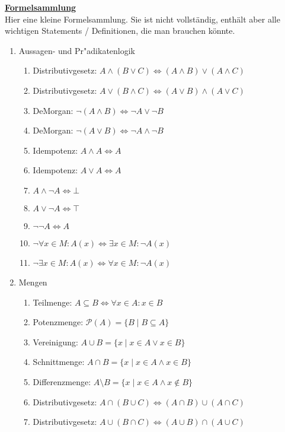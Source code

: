 \hspace{5cm}
\newpage
\underline{\textbf{Formelsammlung}}\\
Hier eine kleine Formelsammlung. Sie ist nicht vollständig, enthält aber alle wichtigen Statements / Definitionen, die man brauchen könnte.
\begin{enumerate}
\item Aussagen- und Pr"adikatenlogik
\begin{enumerate}
    \item Distributivgesetz: $A\wedge (B \vee C) \Leftrightarrow (A\wedge B) \vee (A\wedge C)$
    \item Distributivgesetz: $A\vee (B \wedge C) \Leftrightarrow (A\vee B) \wedge (A\vee C)$
    \item DeMorgan: $\neg(A\wedge B) \Leftrightarrow \neg A \vee \neg B$
    \item DeMorgan: $\neg(A\vee B) \Leftrightarrow \neg A \wedge \neg B$
    \item Idempotenz: $A\wedge A \Leftrightarrow A$
    \item Idempotenz: $A\vee A \Leftrightarrow A$
    \item $A\wedge \neg A \Leftrightarrow \bot$
    \item $A\vee \neg A \Leftrightarrow \top$
    \item $\neg\neg A \Leftrightarrow A$
    \item $\neg\forall x\in M: A(x) \Leftrightarrow \exists x\in M: \neg A(x)$
    \item $\neg\exists x\in M: A(x) \Leftrightarrow \forall x\in M: \neg A(x)$
\end{enumerate}
\item Mengen
\begin{enumerate}
    \item Teilmenge: $A\subseteq B \Leftrightarrow \forall x\in A: x\in B$
    \item Potenzmenge: $\mathscr{P}(A) = \{B\mid B\subseteq A\}$
    \item Vereinigung: $A\cup B = \{x\mid x\in A \vee x\in B\}$
    \item Schnittmenge: $A\cap B = \{x\mid x\in A \wedge x\in B\}$
    \item Differenzmenge: $A\setminus B = \{x\mid x\in A \wedge x\notin B\}$
    \item Distributivgesetz: $A\cap (B \cup C) \Leftrightarrow (A\cap B) \cup (A\cap C)$
    \item Distributivgesetz: $A\cup (B \cap C) \Leftrightarrow (A\cup B) \cap (A\cup C)$

\end{enumerate}
\end{enumerate}
